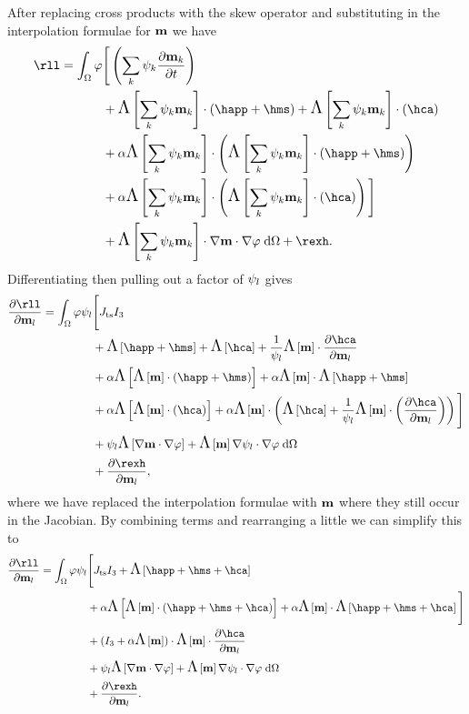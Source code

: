 After replacing cross products with the skew operator and substituting in the interpolation formulae for $\mathbf{m}$ we have
\begin{equation}
  \begin{aligned}
    \rll = \int_\magd \tbf &\Bigg[ \left( \sum_\ibasisc \sk \pd{\mv_\ibasisc}{t} \right)
      \\
      & + \crossop{\intp{\mv}}{\happ + \hms} + \crossop{\intp{\mv}}{\hca}
      \\
      &+ \dampc \crossop{\intp{\mv}}{\crossop{\intp{\mv}}{\happ + \hms}}
      \\
      &+ \dampc \crossop{\intp{\mv}}{\crossop{\intp{\mv}}{\hca}} \Bigg] \\
    &+ \skewm{\intp{\mv}} \cdot \nabla \mv \cdot \nabla \tbf \d\magd
    + \rexh.
  \end{aligned}
\end{equation}
Differentiating then pulling out a factor of $\psi_l$ gives
\begin{equation}
  \begin{aligned}
    \pd{\rll}{\mv_l} =  \int_\magd \tbf \sbf_l &\Bigg[
      \dtsdml I_3
      \\
      &+ \skewm{\happ + \hms} + \skewm{\hca} + \frac{1}{\sbf_l} \skewm{\mv} \cdot \pd{\hca}{\mv_l}
      \\
      &+ \dampc \skewm{\crossop{\mv}{\happ + \hms}}
      + \dampc \skewm{\mv} \cdot \skewm{\happ + \hms}
      \\
      &+ \dampc \skewm{\crossop{\mv}{\hca}}
      + \dampc \crossop{\mv}{\skewm{\hca} + \frac{1}{\sbf_l}\crossop{\mv}{\pd{\hca}{\mv_l}}}
      \Bigg]
    \\
    &+ \sbf_l \skewm{\nabla \mv \cdot \nabla \tbf}
    + \skewm{\mv} \nabla \sbf_l \cdot \nabla \tbf \d\magd
    \\
    &+ \pd{\rexh}{\mv_l},
  \end{aligned}
\end{equation}
where we have replaced the interpolation formulae with $\mathbf{m}$ where they still occur in the Jacobian.
By combining terms and rearranging a little we can simplify this to
\begin{equation}
  \begin{aligned}
    \pd{\rll}{\mv_l} =  \int_\magd \tbf \sbf_l &\Bigg[
      \dtsdml I_3
      + \skewm{\happ + \hms + \hca}
      \\
      &+ \dampc \skewm{ \crossop{\mv}{\happ + \hms + \hca}}
      + \dampc \skewm{\mv} \cdot \skewm{\happ + \hms + \hca}
      \Bigg]
    \\
    &+ (I_3 + \dampc \skewm{\mv}) \cdot \skewm{\mv} \cdot \pd{\hca}{\mv_l}
    \\
    &+ \sbf_l \skewm{\nabla \mv \cdot \nabla \tbf}
    + \skewm{\mv} \nabla \sbf_l \cdot \nabla \tbf \d\magd
    \\
    &+ \pd{\rexh}{\mv_l}.
  \end{aligned}
\end{equation}


